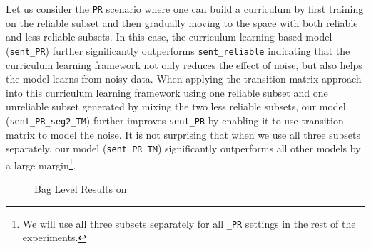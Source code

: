 Let us consider the \texttt{PR} scenario where one can build a curriculum by first training on the
reliable subset and then gradually moving to the space with both reliable and less
reliable subsets. In this case, the curriculum learning based model
(\texttt{sent\_PR}) further significantly outperforms \texttt{sent\_reliable}
indicating that the curriculum learning framework not only reduces the effect
of noise, but also helps the model learns from noisy data. When applying the
transition matrix approach into this curriculum learning framework using one reliable
subset and one unreliable subset generated by mixing the two less reliable subsets, our model (\texttt{sent\_PR\_seg2\_TM})
further improves \texttt{sent\_PR} by  %
enabling it to use transition matrix to model the noise.
It is not surprising that when we use all three subsets separately,
our model (\texttt{sent\_PR\_TM}) significantly outperforms all
other models by a large margin\footnote{We will use all three subsets separately for all
\texttt{\_PR} settings in the rest of the experiments.}. 

\begin{figure}[t!]
\centering
{}
\caption{Bag Level Results on \TimeRE}
\label{fig: results_on_luo}
\end{figure}


